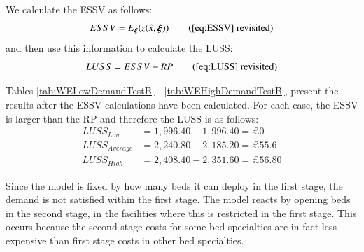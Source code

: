 \documentclass[../thesis.tex]{subfiles}
\begin{document}
We calculate the ESSV as follows:
\begin{equation}
    ESSV = E_{\boldsymbol{\xi}}(z(\hat x, \boldsymbol{\xi})) \tag{\ref{eq:ESSV} revisited} 
\end{equation}
and then use this information to calculate the LUSS:
\begin{equation}
    LUSS = ESSV - RP\tag{\ref{eq:LUSS} revisited}
\end{equation}

Tables \ref{tab:WELowDemandTestB} - \ref{tab:WEHighDemandTestB}, present the results after the ESSV calculations have been calculated. For each case, the ESSV is larger than the RP and therefore the LUSS is as follows:
\vspace{-0.25cm}
\begin{align}
    LUSS_{Low} & = 1,996.40 - 1,996.40 = \pounds0\\
    LUSS_{Average} & = 2,240.80 - 2,185.20 = \pounds55.6\\
    LUSS_{High} & = 2,408.40 - 2,351.60  = \pounds56.80
\end{align}

Since the model is fixed by how many beds it can deploy in the first stage, the demand is not satisfied within the first stage. The model reacts by opening beds in the second stage, in the facilities where this is restricted in the first stage. This occurs because the second stage costs for some bed specialties are in fact less expensive than first stage costs in other bed specialties.


\begin{table}[h!]
    \centering{}
    \caption{Test B results for the worked example using low daily bed demand values, with results recorded in the form [(beds), (staff)].}
    \label{tab:WELowDemandTestB}
\end{table}
\end{document}
